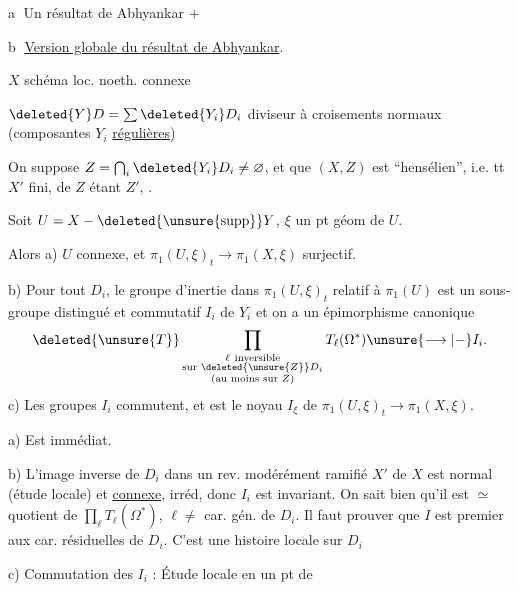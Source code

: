 

\textcircled{a} Un résultat  de Abhyankar \textcircled{$+$}

\textcircled{b} \uline{Version globale du  résultat de Abhyankar}.

$X$ schéma loc. noeth. connexe

$\deleted{Y}D=\sum\deleted{Y_i}D_i$ diviseur  à croisements normaux
(composantes $Y_i$ \uline{régulières})

On suppose $Z=\bigcap_i\deleted{Y_i}D_i\ne\varnothing$, et que   $(X,Z)$ est ``hensélien'', i.e.
 tt $X'$ fini,  de $Z$ étant $Z'$,   \unsure{$\longleftrightarrow$}.

 Soit  $U=X-\deleted{\unsure{\operatorname{supp}}}Y$, $\xi$ un pt géom de $U$.

Alors a) $U$ connexe, et $\pi_1(U,\xi)_t\longrightarrow\pi_1(X,\xi)$ surjectif.

b) Pour tout $D_i$, le groupe d'inertie dans
$\pi_1(U,\xi)_t$ relatif à $\pi_1(U)$ est un sous-groupe distingué et
 commutatif $I_i$ de $Y_i$  et on a
un épimorphisme canonique
\[
 \deleted{\unsure{T}}\prod_{\substack{\ell\ \text{inversible}\\\text{sur }\deleted{\unsure{Z}}D_i\\(\text{au moins sur }Z)}}T_\ell(\Omega^*)\unsure{\longrightarrow|-}I_i .
\]
c) Les groupes $I_i$ commutent, et   est le noyau $I_\xi$ de $\pi_1(U,\xi)_t\longrightarrow\pi_1(X,\xi)$.

a) Est immédiat.

b) L'image inverse de $D_i$ dans un rev.   modérément
ramifié $X'$ de $X$ est normal (étude locale) et \uline{connexe},
 irréd, donc $I_i$ est invariant. On sait
bien qu'il est $\simeq$ quotient de $\prod_\ell T_\ell(\Omega^*)$, $\ell\ne$ car. gén. de $D_i$.
Il faut prouver que $I$ est premier aux car. résiduelles
de $D_i$. C'est une histoire locale sur $D_i$

c) Commutation des $I_i$ :  Étude locale en un pt de
